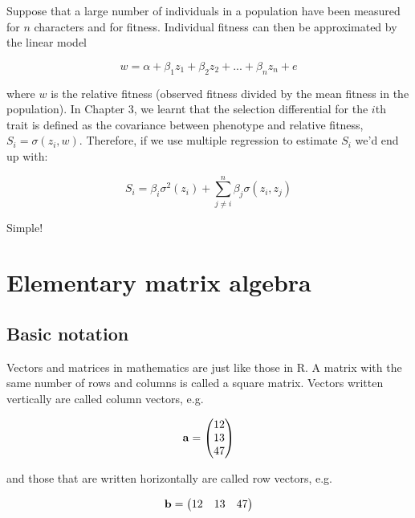 \documentclass[
]{book}
\begin{document}
Suppose that a large number of individuals in a population have been measured for \(n\) characters and for fitness. Individual fitness can then be approximated by the linear model

\begin{equation}
    w = \alpha + \beta_1z_1 + \beta_2z_2 + ... + \beta_nz_n + e
    \label{eq:fitness-linear-model}
\end{equation}

where \(w\) is the relative fitness (observed fitness divided by the mean fitness in the population). In Chapter 3, we learnt that the selection differential for the \(i\)th trait is defined as the covariance between phenotype and relative fitness, \(S_i = \sigma(z_i, w)\). Therefore, if we use multiple regression to estimate \(S_i\) we'd end up with:

\begin{equation}
    S_i = \beta_i\sigma^2(z_i) + \sum^n_{j \neq i} {\beta_j\sigma(z_i, z_j)}
    \label{eq:ith-selection-differential} 
\end{equation}

Simple!

\hypertarget{elementary-matrix-algebra}{%
\section{Elementary matrix algebra}\label{elementary-matrix-algebra}}

\hypertarget{basic-notation}{%
\subsection{Basic notation}\label{basic-notation}}

Vectors and matrices in mathematics are just like those in R. A matrix with the same number of rows and columns is called a square matrix. Vectors written vertically are called column vectors, e.g.~

\begin{equation}
    \mathbf{a} = 
    \begin{pmatrix}
        12 \\
        13 \\
        47
    \end{pmatrix}
    \notag
\end{equation}

and those that are written horizontally are called row vectors, e.g.~

\begin{equation}
    \mathbf{b} = 
    \begin{pmatrix}
        12 & 13 & 47
    \end{pmatrix}
    \notag
\end{equation}
\end{document}

